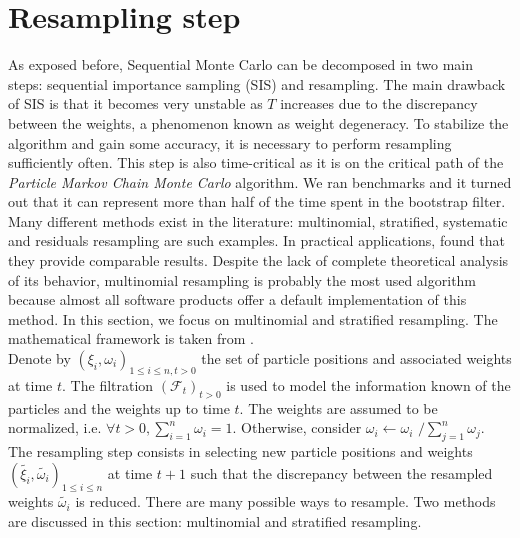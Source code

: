 \documentclass[11pt,a4,twosided,singlespacing,titlepagenumber=on]{scrreprt}
\numberwithin{equation}{chapter} %
\theoremstyle{remark}
\begin{document}
\section{Resampling step}
As exposed before, Sequential Monte Carlo can be decomposed in two main steps: sequential importance sampling (SIS) and resampling. The main drawback of SIS is that it becomes very unstable as $T$ increases due to the discrepancy between the weights, a phenomenon known as weight degeneracy. To stabilize the algorithm and gain some accuracy, it is necessary to perform resampling sufficiently often. This step is also time-critical as it is on the critical path of the \textit{Particle Markov Chain Monte Carlo} algorithm. We ran benchmarks and it turned out that it can represent more than half of the time spent in the bootstrap filter. Many different methods exist in the literature: multinomial, stratified, systematic and residuals resampling are such examples. In practical applications, \cite{douc2005} found that they provide comparable results. Despite the lack of complete theoretical analysis of its behavior, multinomial resampling is probably the most used algorithm because almost all software products offer a default implementation of this method. In this section, we focus on multinomial and stratified resampling. The mathematical framework is taken from \cite{douc2005}. \\

Denote by $\left( \xi_i, \omega_i \right)_{1 \leq i \leq n, t > 0}$ the set of particle positions and associated weights at time $t$. The filtration $(\mathcal{F}_t)_{t > 0}$ is used to model the information known of the particles and the weights up to time $t$. The weights are assumed to be normalized, i.e. $\forall t > 0, \sum_{i=1}^n \omega_i = 1$. Otherwise, consider $\omega_i \leftarrow \omega_i \text{ /} \sum_{j=1}^n \omega_j$. The resampling step consists in selecting new particle positions and weights $\left( \widetilde{\xi_i}, \widetilde{\omega_i} \right)_{1 \leq i \leq n}$ at time $t+1$ such that the discrepancy between the resampled weights $\widetilde{\omega_i}$ is reduced. There are many possible ways to resample. Two methods are discussed in this section: multinomial and stratified resampling. \\
\end{document}
